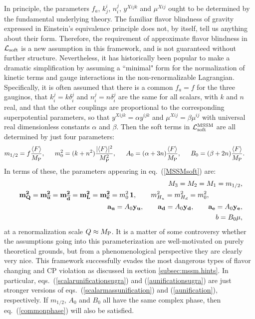 \documentclass[12pt]{article}
\def\beq{\begin{eqnarray}}
\def\eeq{\end{eqnarray}}
\def\sbar{\overline}
\def\lagr{{\cal L}}
\def\MPlanck{M_{\rm P}}
\def\FX{F}
\begin{document}
In principle, the parameters $f_a$, $k^i_j$, $n_i^j$, $y^{Xijk}$ and $\mu^{Xij}$ 
ought to be 
determined by the fundamental underlying theory. The familiar flavor 
blindness of 
gravity expressed in Einstein's equivalence principle does not, by 
itself, tell us anything about their form.
Therefore, the requirement of approximate flavor blindness 
in ${\cal L}_{\rm soft}$ is a new 
assumption in this framework, and is not guaranteed without further 
structure. Nevertheless, it has 
historically been popular to make a dramatic simplification by assuming a 
``minimal" form for the normalization of kinetic terms and gauge 
interactions in the non-renormalizable Lagrangian. 
Specifically, it is often assumed that there is a common $f_a=f$ for the 
three gauginos, that $k_i^j = k \delta_i^j$ and $n_i^j = n \delta_i^j$ 
are the same for all scalars, with $k$ and $n$ real,
and that the other couplings are proportional to the corresponding 
superpotential parameters, so that $y^{Xijk} = \alpha y^{ijk}$ and 
$\mu^{Xij} = \beta \mu^{ij}$ with universal real dimensionless constants 
$\alpha$ and $\beta$. Then the soft terms in $\lagr_{\rm soft}^{\rm MSSM}$ 
are all determined by just four parameters:
\beq
m_{1/2} = f{\langle \FX \rangle\over \MPlanck},\qquad\!\!\!
m^2_{0} = (k + n^2) {|\langle \FX \rangle|^2\over \MPlanck^2},\qquad\!\!\!
A_0 = (\alpha + 3n){\langle \FX \rangle\over \MPlanck},\qquad\!\!\!
B_0 = (\beta + 2 n) {\langle \FX \rangle\over \MPlanck}.\>\>\phantom{xx}
\label{sillyassumptions}
\eeq
In terms of these, the parameters appearing in
eq.~(\ref{MSSMsoft}) are:
\beq
&&\!\!\!\! M_3 = M_2 = M_1 = m_{1/2},
\label{gauginounificationsugra}
\\
&&\!\!\!\! {\bf m^2_{Q}} =
{\bf m^2_{{\sbar u}}} =
{\bf m^2_{{\sbar d}}} =
{\bf m^2_{ L}} =
{\bf m^2_{{\sbar e}}} =
m_0^2\, {\bf 1},
\>\>\>\>\>\>\>\> \> m_{H_u}^2 = m^2_{H_d} = m_0^2, \>\>\>\qquad\qquad{}
\label{scalarunificationsugra}
\\
&&\!\!\!\! {\bf a_u} = A_0 {\bf y_u},\qquad
{\bf a_d} = A_0 {\bf y_d},\qquad
{\bf a_e} = A_0 {\bf y_e},
\label{aunificationsugra}
\\
&&\!\!\!\! b = B_0 \mu ,
\label{bsilly}
\eeq
at a renormalization scale $Q \approx \MPlanck$. It is a matter of some 
controversy whether the assumptions going into this parameterization are 
well-motivated on purely theoretical grounds, but from 
a phenomenological perspective they are clearly very nice. This framework 
successfully evades the most dangerous types of flavor changing and CP 
violation as discussed in section \ref{subsec:mssm.hints}. In particular, 
eqs.~(\ref{scalarunificationsugra}) and (\ref{aunificationsugra}) are just 
stronger versions of eqs.~(\ref{scalarmassunification}) and 
(\ref{aunification}), respectively. If $m_{1/2}$, $A_0$ and $B_0$ all have 
the same complex phase, then eq.~(\ref{commonphase}) will also be 
satisfied.
\end{document}
